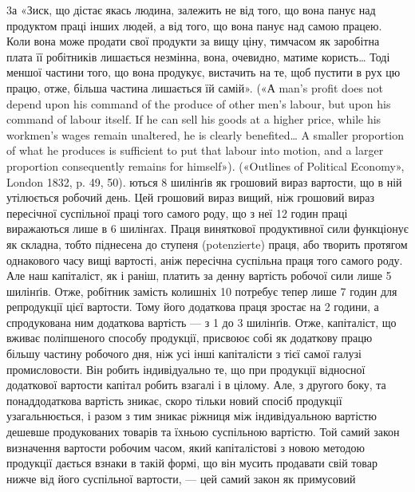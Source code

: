 3а «Зиск, що дістає якась людина, залежить не від того, що вона
панує над продуктом праці інших людей, а від того, що вона панує над
самою працею. Коли вона може продати свої продукти за вищу ціну, тимчасом
як заробітна плата її робітників лишається незмінна, вона, очевидно,
матиме користь\dots{} Тоді меншої частини того, що вона продукує, вистачить
на те, щоб пустити в рух цю працю, отже, більша частина лишається їй
самій». («А man’s profit does not depend upon his command of the produce
of other men’s labour, but upon his command of labour itself. If he can sell
his goods at a higher price, while his workmen's wages remain unaltered,
he is clearly benefited\dots{} A smaller proportion of what he produces is sufficient
to put that labour into motion, and a larger proportion consequently
remains for himself»). («Outlines of Political Economy», London 1832,
p. 49, 50).
ються 8 шилінґів як грошовий вираз вартости, що в ній утілюється робочий день. Цей грошовий вираз
вищий, ніж грошовий
вираз пересічної суспільної праці того самого роду, що з неї
12 годин праці виражаються лише в 6 шилінґах. Праця виняткової продуктивної сили функціонує як
складна, тобто піднесена
до ступеня (potenzierte) праця, або творить протягом однакового
часу вищі вартості, аніж пересічна суспільна праця того самого
роду. Але наш капіталіст, як і раніш, платить за денну вартість
робочої сили лише 5 шилінґів. Отже, робітник замість колишніх
10 потребує тепер лише 7 годин для репродукції цієї вартости.
Тому його додаткова праця зростає на 2 години, а спродукована
ним додаткова вартість — з 1 до 3 шилінґів. Отже, капіталіст,
що вживає поліпшеного способу продукції, присвоює собі як додаткову працю більшу частину робочого
дня, ніж усі інші капіталісти
з тієї самої галузі промисловости. Він робить індивідуально те,
що при продукції відносної додаткової вартости капітал робить
взагалі і в цілому. Але, з другого боку, та понаддодаткова вартість
зникає, скоро тільки новий спосіб продукції узагальнюється, і
разом з тим зникає ріжниця між індивідуальною вартістю дешевше
продукованих товарів та їхньою суспільною вартістю. Той самий
закон визначення вартости робочим часом, який капіталістові
з новою методою продукції дається взнаки в такій формі, що він
мусить продавати свій товар нижче від його суспільної вартости, — цей самий закон як примусовий
